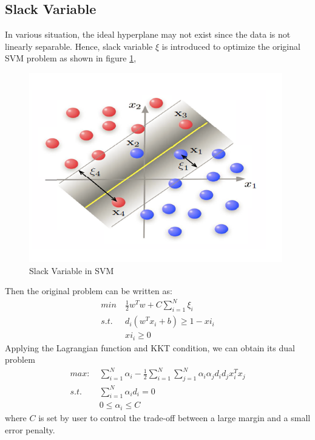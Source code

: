 \documentclass[twocolumn, a4paper]{article}
\begin{document}
\subsection{Slack Variable}
In various situation, the ideal hyperplane may not exist since the data is not linearly separable. Hence, slack variable $\xi$ is introduced to optimize the original SVM problem as shown in figure \ref{fig:sla},
\begin{figure}[htb]
  \centering
  \includegraphics{slack.png}
  \caption{Slack Variable in SVM}
  \label{fig:sla}
\end{figure}
Then the original problem can be written as:
\begin{equation}
\begin{aligned}
\nonumber
  min\ &\frac{1}{2}w^Tw+C\sum_{i=1}^N\xi_i\\
  s.t.\ &d_i(w^Tx_i+b)\ge 1-xi_i\\
  &xi_i\ge 0
\end{aligned}
\end{equation}
Applying the Lagrangian function and KKT condition, we can obtain its dual problem
\begin{equation}
\begin{aligned}
\nonumber
  max:\ &\sum_{i=1}^N\alpha_i-\frac{1}{2}\sum_{i=1}^N\sum_{j=1}^N\alpha_i\alpha_jd_id_jx_i^Tx_j\\
  s.t.\ \ &\sum_{i=1}^N\alpha_id_i=0\\
  &0\le \alpha_i\le C
\end{aligned}
\end{equation}
where $C$ is set by user to control the trade-off between a large margin and a small error penalty.
\end{document}
